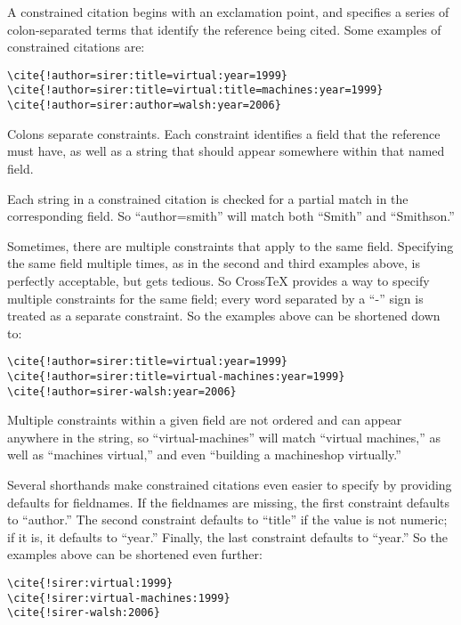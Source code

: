 \documentclass{article}
\newcommand{\XTeX}{Cross\TeX}
\begin{document}
A constrained citation begins with an exclamation point, and specifies a series of colon-separated
terms that identify the reference being cited. Some examples of constrained citations are:
\begin{small}\begin{verbatim}
\cite{!author=sirer:title=virtual:year=1999}
\cite{!author=sirer:title=virtual:title=machines:year=1999}
\cite{!author=sirer:author=walsh:year=2006}
\end{verbatim}\end{small}
Colons separate constraints. Each constraint identifies 
a field that the reference must have, as well as a string that should appear somewhere within that 
named field. 

Each string in a constrained citation is checked for a partial match in the corresponding field. So 
``author=smith'' will match both ``Smith'' and ``Smithson.''

Sometimes, there are multiple constraints that apply to the same field. Specifying the same field multiple times, 
as in the second and third examples above, is perfectly acceptable, but gets tedious. So \XTeX{} provides a
way to specify multiple constraints for the same field; every word separated by a ``-'' sign is treated
as a separate constraint. So the examples above can be shortened down to:
\begin{small}\begin{verbatim}
\cite{!author=sirer:title=virtual:year=1999}
\cite{!author=sirer:title=virtual-machines:year=1999}
\cite{!author=sirer-walsh:year=2006}
\end{verbatim}\end{small}

Multiple constraints within a given field are not ordered and can appear anywhere in the string, so 
``virtual-machines'' will match ``virtual machines,'' as well as ``machines virtual,'' and even 
``building a machineshop virtually.'' 

Several shorthands make constrained citations even easier to specify by providing defaults 
for fieldnames. If the fieldnames are missing, the first constraint defaults to ``author.'' The
second constraint defaults to ``title'' if the value is not numeric; if it is, it defaults to ``year.'' 
Finally, the last constraint defaults to ``year.'' So the examples above can be shortened even further:
\begin{small}\begin{verbatim}
\cite{!sirer:virtual:1999}
\cite{!sirer:virtual-machines:1999}
\cite{!sirer-walsh:2006}
\end{verbatim}\end{small}
\end{document}
